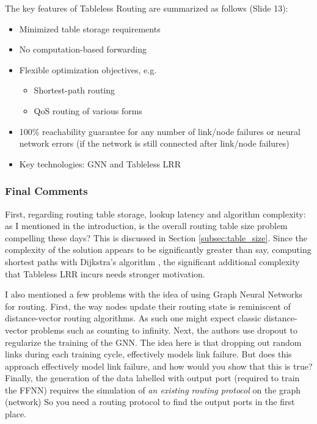 \documentclass[11pt, oneside]{article}   	%
\begin{document}
The key features of Tableless Routing are summarized as follows (Slide 13):
\begin{itemize}
\item Minimized table storage requirements
\item  No computation-based forwarding
\item Flexible optimization objectives, e.g.
\begin{itemize}
\item Shortest-path routing
\item QoS routing of various forms
\end{itemize}
\item 100\% reachability guarantee for any number of link/node failures or neural network errors (if the network
is still connected after link/node failures)
\item Key technologies: GNN and Tableless LRR
\end{itemize}

\bigskip
\noindent
\subsubsection{Final Comments}
First, regarding routing table storage, lookup latency and algorithm complexity: as I mentioned in the introduction, is the overall routing table size problem compelling these days?
This is discussed in Section \ref{subsec:table_size}. Since the complexity of the solution appears to be significantly greater than say, computing shortest paths with 
Dijkstra's algorithm \cite{Ahuja:1990:FAS:77600.77615}, the significant additional complexity that Tableless LRR incurs needs stronger motivation.

\bigskip
\noindent
I also mentioned a few problems with the idea of using Graph Neural Networks for routing. First, the way nodes update their routing state is reminiscent of
distance-vector routing algorithms. As such one might expect classic distance-vector problems such as counting to infinity. Next, the authors use 
dropout \cite{Srivastava:2014:DSW:2627435.2670313}  to regularize the training of the GNN. The idea here is that dropping out random links during each 
training cycle, effectively models link failure. But does this approach effectively model link failure, and how would you show that this is true? Finally,  the generation
of the data labelled with output port (required to train the FFNN) requires the simulation of \emph{an existing routing protocol} on the graph (network)  So you need 
a routing protocol to find the output ports in the first place.
\end{document}
